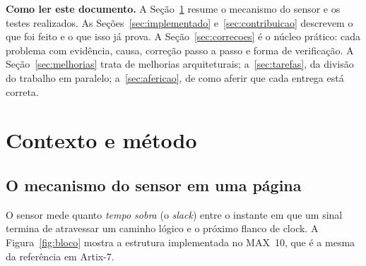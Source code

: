 \documentclass[11pt,a4paper]{article}
\begin{document}
\noindent\textbf{Como ler este documento.} A Seção~\ref{sec:contexto} resume o mecanismo do
sensor e os testes realizados. As Seções~\ref{sec:implementado} e~\ref{sec:contribuicao}
descrevem o que foi feito e o que isso já prova. A Seção~\ref{sec:correcoes} é o núcleo
prático: cada problema com evidência, causa, correção passo a passo e forma de verificação.
A Seção~\ref{sec:melhorias} trata de melhorias arquiteturais; a~\ref{sec:tarefas}, da
divisão do trabalho em paralelo; a~\ref{sec:afericao}, de como aferir que cada entrega
está correta.

\section{Contexto e método}
\label{sec:contexto}

\subsection{O mecanismo do sensor em uma página}

O sensor mede quanto \emph{tempo sobra} (o \emph{slack}) entre o instante em que um sinal
termina de atravessar um caminho lógico e o próximo flanco de clock. A Figura~\ref{fig:bloco}
mostra a estrutura implementada no MAX~10, que é a mesma da referência em Artix-7.
\end{document}
